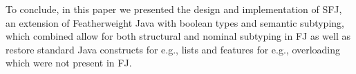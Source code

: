\documentclass[runningheads]{llncs}
\begin{document}
To conclude, in this paper we presented the design and implementation of SFJ, an extension of Featherweight Java with boolean types and semantic subtyping, which combined allow for both structural and nominal subtyping in FJ as well as restore standard Java constructs for e.g., lists and features for e.g., overloading which were not present in FJ. 

\newpage


\end{document}
